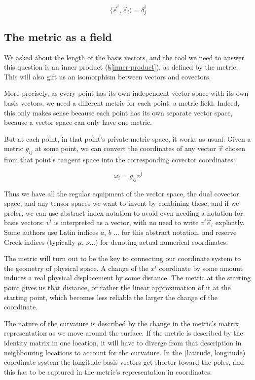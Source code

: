 $$
\langle \vec{e}^i , \vec{e}_i \rangle = \delta^i_j
$$

\subsection{The metric as a field}

We asked about the length of the basis vectors, and the tool we need to answer this question is an inner product (§\ref{inner-product}), as defined by the metric. This will also gift us an isomorphism between vectors and covectors.

More precisely, as every point has its own independent vector space with its own basis vectors, we need a different metric for each point: a metric field. Indeed, this only makes sense because each point has its own separate vector space, because a vector space can only have one metric.

But at each point, in that point's private metric space, it works as usual. Given a metric $g_{ij}$ at some point, we can convert the coordinates of any vector $\vec{v}$ chosen from that point's tangent space into the corresponding covector coordinates:

$$
\omega_i = g_{ij} v^j
$$

Thus we have all the regular equipment of the vector space, the dual covector space, and any tensor spaces we want to invent by combining these, and if we prefer, we can use abstract index notation to avoid even needing a notation for basis vectors: $v^i$ is interpreted as a vector, with no need to write $v^i \vec{e}_i$ explicitly. Some authors use Latin indices $a$, $b$ ... for this abstract notation, and reserve Greek indices (typically $\mu$, $\nu$...) for denoting actual numerical coordinates.

The metric will turn out to be the key to connecting our coordinate system to the geometry of physical space. A change of the $x^i$ coordinate by some amount induces a real physical displacement by some distance. The metric at the starting point gives us that distance, or rather the linear approximation of it at the starting point, which becomes less reliable the larger the change of the coordinate.

The nature of the curvature is described by the change in the metric's matrix representation as we move around the surface. If the metric is described by the identity matrix in one location, it will have to diverge from that description in neighbouring locations to account for the curvature. In the (latitude, longitude) coordinate system the longitude basis vectors get shorter toward the poles, and this has to be captured in the metric's representation in coordinates.

